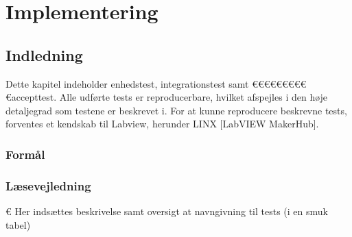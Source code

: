 \chapter{Implementering}
\renewcommand{\arraystretch}{1.5}


\section{Indledning}
	Dette kapitel indeholder enhedstest, integrationstest samt €€€€€€€€€€accepttest. Alle udførte tests er reproducerbare, hvilket afspejles i den høje detaljegrad som testene er beskrevet i. For at kunne reproducere beskrevne tests, forventes et kendskab til Labview, herunder LINX [LabVIEW MakerHub]. 
	
		\subsection{Formål}
	
		\subsection{Læsevejledning}	
	
	
	€ Her indsættes beskrivelse samt oversigt at navngivning til tests (i en smuk tabel)
	

